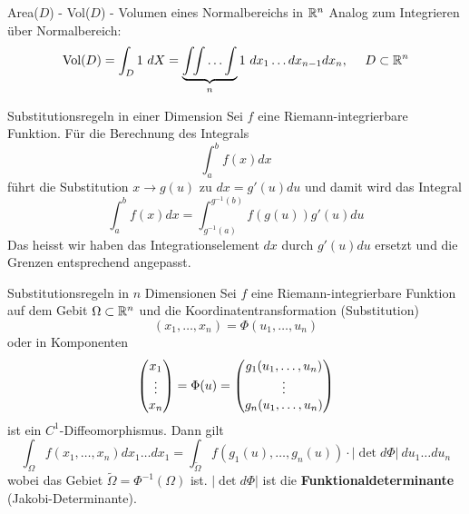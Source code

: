 \begin{Rezept}{Area($D$) - Vol($D$) - Volumen eines Normalbereichs in $\mathbb{R}^n$}{}
Analog zum Integrieren über Normalbereich:
\[ \text{Vol}(D) = \int_D 1 ~ dX = \underbrace{\int \!\! \int \ldots \int}_{n} 1 ~ dx_1 \ldots dx_{n-1} dx_n,
  ~~~~ D \subset \mathbb{R}^n\]
\end{Rezept}



\begin{Satz}{Substitutionsregeln in einer Dimension}{}
    Sei $f$ eine Riemann-integrierbare Funktion. Für die Berechnung des Integrals
    \[
        \int_a^b f(x) dx
    \]
    führt die Substitution $x \to g(u)$ zu $dx = g'(u)du$ und damit wird das Integral
    \[
        \int_a^b f(x) dx = \int_{g^{-1}(a)}^{g^{-1}(b)} f(g(u)) g'(u) du
    \]
    Das heisst wir haben das Integrationselement $dx$ durch $g'(u)du$ ersetzt und die Grenzen entsprechend angepasst.
\end{Satz}

\begin{Satz}{Substitutionsregeln in $n$ Dimensionen}{}
    Sei $f$ eine Riemann-integrierbare Funktion auf dem Gebit $\Omega \subset \mathbb{R}^n$ und die Koordinatentransformation (Substitution)
    \[
    (x_1,\hdots,x_n) = \Phi(u_1, \hdots,  u_n)
    \]
    oder in Komponenten
    \[
        \begin{pmatrix} x_1 \\ \vdots \\ x_n \end{pmatrix}
        = \Phi(u)
        = \begin{pmatrix} g_1(u_1,\hdots,u_n) \\ \vdots \\ g_n(u_1,\hdots,u_n) \end{pmatrix}
    \]
    ist ein $C^1$-Diffeomorphismus. Dann gilt
    \[
        \int_\Omega f(x_1, \hdots, x_n)dx_1\hdots dx_1 = \int_{\widetilde{\Omega}} f(g_1(u), \hdots, g_n(u)) \cdot |\det d \Phi|\ du_1\hdots du_n
    \]
    wobei das Gebiet $\widetilde{\Omega} = \Phi^{-1}(\Omega)$ ist. $|\det d\Phi|$ ist die \textbf{Funktionaldeterminante} (Jakobi-Determinante).
\end{Satz}

